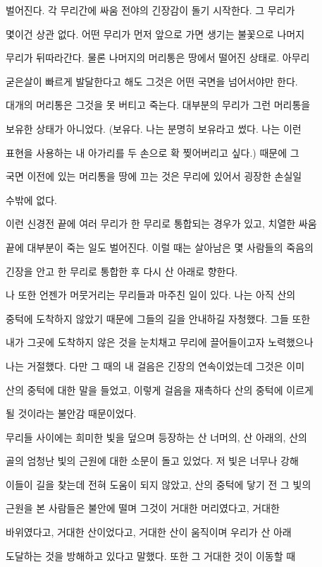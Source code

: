 벌어진다. 각 무리간에 싸움 전야의 긴장감이 돌기 시작한다. 그 무리가

몇이건 상관 없다. 어떤 무리가 먼저 앞으로 가면 생기는 불꽃으로 나머지

무리가 뒤따라간다. 물론 나머지의 머리통은 땅에서 떨어진 상태로. 아무리

굳은살이 빠르게 발달한다고 해도 그것은 어떤 국면을 넘어서야만 한다.

대개의 머리통은 그것을 못 버티고 죽는다. 대부분의 무리가 그런 머리통을

보유한 상태가 아니었다. (보유다. 나는 분명히 보유라고 썼다. 나는 이런

표현을 사용하는 내 아가리를 두 손으로 확 찢어버리고 싶다.) 때문에 그

국면 이전에 있는 머리통을 땅에 끄는 것은 무리에 있어서 굉장한 손실일

수밖에 없다.



이런 신경전 끝에 여러 무리가 한 무리로 통합되는 경우가 있고, 치열한 싸움

끝에 대부분이 죽는 일도 벌어진다. 이럴 때는 살아남은 몇 사람들의 죽음의

긴장을 안고 한 무리로 통합한 후 다시 산 아래로 향한다.



나 또한 언젠가 머뭇거리는 무리들과 마주친 일이 있다. 나는 아직 산의

중턱에 도착하지 않았기 때문에 그들의 길을 안내하길 자청했다. 그들 또한

내가 그곳에 도착하지 않은 것을 눈치채고 무리에 끌어들이고자 노력했으나

나는 거절했다. 다만 그 때의 내 걸음은 긴장의 연속이었는데 그것은 이미

산의 중턱에 대한 말을 들었고, 이렇게 걸음을 재촉하다 산의 중턱에 이르게

될 것이라는 불안감 때문이었다.



무리들 사이에는 희미한 빛을 덮으며 등장하는 산 너머의, 산 아래의, 산의

골의 엄청난 빛의 근원에 대한 소문이 돌고 있었다. 저 빛은 너무나 강해

이들이 길을 찾는데 전혀 도움이 되지 않았고, 산의 중턱에 닿기 전 그 빛의

근원을 본 사람들은 불안에 떨며 그것이 거대한 머리였다고, 거대한

바위였다고, 거대한 산이었다고, 거대한 산이 움직이며 우리가 산 아래

도달하는 것을 방해하고 있다고 말했다. 또한 그 거대한 것이 이동할 때

